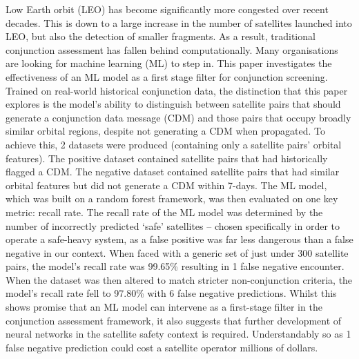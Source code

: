 Low Earth orbit (LEO) has become significantly more congested over recent decades. This is down to a large increase in the number of satellites launched into LEO, but also the detection of smaller fragments. As a result, traditional conjunction assessment has fallen behind computationally. Many organisations are looking for machine learning (ML) to step in. This paper investigates the effectiveness of an ML model as a first stage filter for conjunction screening. Trained on real-world historical conjunction data, the distinction that this paper explores is the model’s ability to distinguish between satellite pairs that should generate a conjunction data message (CDM) and those pairs that occupy broadly similar orbital regions, despite not generating a CDM when propagated. To achieve this, 2 datasets were produced (containing only a satellite pairs’ orbital features). The positive dataset contained satellite pairs that had historically flagged a CDM. The negative dataset contained satellite pairs that had similar orbital features but did not generate a CDM within 7-days. The ML model, which was built on a random forest framework, was then evaluated on one key metric: recall rate. The recall rate of the ML model was determined by the number of incorrectly predicted ‘safe’ satellites – chosen specifically in order to operate a safe-heavy system, as a false positive was far less dangerous than a false negative in our context. When faced with a generic set of just under 300 satellite pairs, the model’s recall rate was 99.65\% resulting in 1 false negative encounter. When the dataset was then altered to match stricter non-conjunction criteria, the model’s recall rate fell to 97.80\% with 6 false negative predictions. Whilst this shows promise that an ML model can intervene as a first-stage filter in the conjunction assessment framework, it also suggests that further development of neural networks in the satellite safety context is required. Understandably so as 1 false negative prediction could cost a satellite operator millions of dollars. 